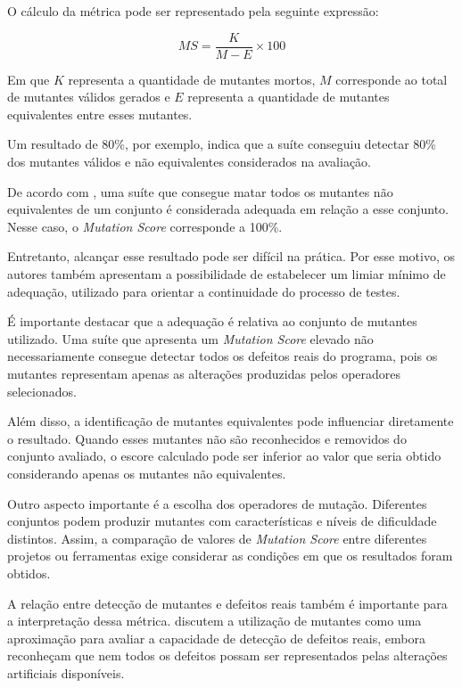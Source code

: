 O cálculo da métrica pode ser representado pela seguinte expressão:

\begin{equation}
    MS = \frac{K}{M - E} \times 100
    \label{eq:mutation-score}
\end{equation}

Em que $K$ representa a quantidade de mutantes mortos, $M$ corresponde ao total de mutantes válidos gerados e $E$ representa a quantidade de mutantes equivalentes entre esses mutantes.

Um resultado de 80\%, por exemplo, indica que a suíte conseguiu detectar 80\% dos mutantes válidos e não equivalentes considerados na avaliação.

De acordo com , uma suíte que consegue matar todos os mutantes não equivalentes de um conjunto é considerada adequada em relação a esse conjunto. Nesse caso, o \textit{Mutation Score} corresponde a 100\%.

Entretanto, alcançar esse resultado pode ser difícil na prática. Por esse motivo, os autores também apresentam a possibilidade de estabelecer um limiar mínimo de adequação, utilizado para orientar a continuidade do processo de testes.

É importante destacar que a adequação é relativa ao conjunto de mutantes utilizado. Uma suíte que apresenta um \textit{Mutation Score} elevado não necessariamente consegue detectar todos os defeitos reais do programa, pois os mutantes representam apenas as alterações produzidas pelos operadores selecionados.

Além disso, a identificação de mutantes equivalentes pode influenciar diretamente o resultado. Quando esses mutantes não são reconhecidos e removidos do conjunto avaliado, o escore calculado pode ser inferior ao valor que seria obtido considerando apenas os mutantes não equivalentes.

Outro aspecto importante é a escolha dos operadores de mutação. Diferentes conjuntos podem produzir mutantes com características e níveis de dificuldade distintos. Assim, a comparação de valores de \textit{Mutation Score} entre diferentes projetos ou ferramentas exige considerar as condições em que os resultados foram obtidos.

A relação entre detecção de mutantes e defeitos reais também é importante para a interpretação dessa métrica.  discutem a utilização de mutantes como uma aproximação para avaliar a capacidade de detecção de defeitos reais, embora reconheçam que nem todos os defeitos possam ser representados pelas alterações artificiais disponíveis.

